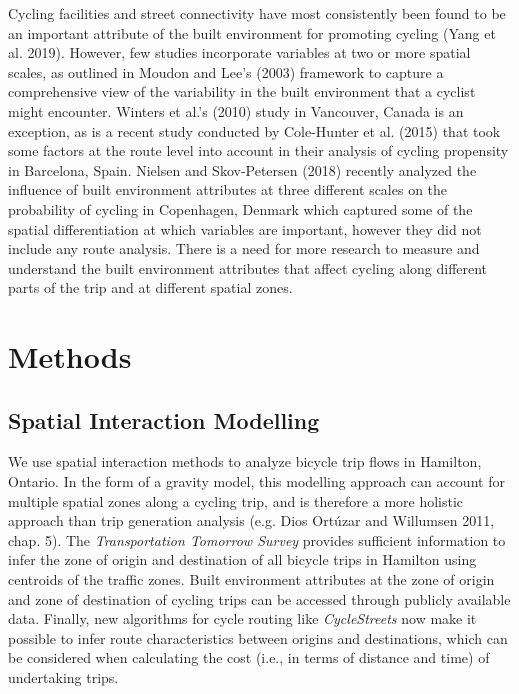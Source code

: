 \documentclass[smallextended]{svjour3}       %
\begin{document}
Cycling facilities and street connectivity have most consistently been
found to be an important attribute of the built environment for
promoting cycling (Yang et al. 2019). However, few studies incorporate
variables at two or more spatial scales, as outlined in Moudon and Lee's
(2003) framework to capture a comprehensive view of the variability in
the built environment that a cyclist might encounter. Winters et al.'s
(2010) study in Vancouver, Canada is an exception, as is a recent study
conducted by Cole-Hunter et al. (2015) that took some factors at the
route level into account in their analysis of cycling propensity in
Barcelona, Spain. Nielsen and Skov-Petersen (2018) recently analyzed the
influence of built environment attributes at three different scales on
the probability of cycling in Copenhagen, Denmark which captured some of
the spatial differentiation at which variables are important, however
they did not include any route analysis. There is a need for more
research to measure and understand the built environment attributes that
affect cycling along different parts of the trip and at different
spatial zones.

\hypertarget{sec:method}{%
\section{Methods}\label{sec:method}}

\hypertarget{model}{%
\subsection{Spatial Interaction Modelling}\label{model}}

We use spatial interaction methods to analyze bicycle trip flows in
Hamilton, Ontario. In the form of a gravity model, this modelling
approach can account for multiple spatial zones along a cycling trip,
and is therefore a more holistic approach than trip generation analysis
(e.g. Dios Ortúzar and Willumsen 2011, chap. 5). The
\emph{Transportation Tomorrow Survey} provides sufficient information to
infer the zone of origin and destination of all bicycle trips in
Hamilton using centroids of the traffic zones. Built environment
attributes at the zone of origin and zone of destination of cycling
trips can be accessed through publicly available data. Finally, new
algorithms for cycle routing like \emph{CycleStreets} now make it
possible to infer route characteristics between origins and
destinations, which can be considered when calculating the cost (i.e.,
in terms of distance and time) of undertaking trips.
\end{document}
